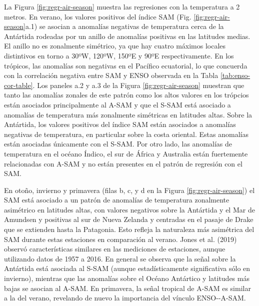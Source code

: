\documentclass[12pt,oneside]{reedthesis}
\begin{document}
La Figura \ref{fig:regr-air-season} muestra las regresiones con la temperatura a 2 metros.
En verano, los valores positivos del índice SAM (Fig. \ref{fig:regr-air-season}a.1) se asocian a anomalías negativas de temperatura cerca de la Antártida rodeadas por un anillo de anomalías positivas en las latitudes medias.
El anillo no es zonalmente simétrico, ya que hay cuatro máximos locales distintivos en torno a 30ºW, 120ºW, 150ºE y 90ºE respectivamente.
En los trópicos, las anomalías son negativas en el Pacífico ecuatorial, lo que concuerda con la correlación negativa entre SAM y ENSO observada en la Tabla \ref{tab:enso-cor-table}.
Los paneles a.2 y a.3 de la Figura \ref{fig:regr-air-season} muestran que tanto las anomalías zonales de este patrón como los altos valores en los trópcios están asociados principalmente al A-SAM y que el S-SAM está asociado a anomalías de temperatura más zonalmente simétricas en latitudes altas.
Sobre la Antártida, los valores positivos del índice SAM están asociados a anomalías negativas de temperatura, en particular sobre la costa oriental.
Estas anomalías están asociadas únicamente con el S-SAM.
Por otro lado, las anomalías de temperatura en el océano Índico, el sur de África y Australia están fuertemente relacionadas con A-SAM y no están presentes en el patrón de regresión con el SAM.

En otoño, invierno y primavera (filas b, c, y d en la Figura \ref{fig:regr-air-season}) el SAM está asociado a un patrón de anomalías de temperatura zonalmente asimétrico en latitudes altas, con valores negativos sobre la Antártida y el Mar de Amundsen y positivas al sur de Nueva Zelanda y centradas en el pasaje de Drake que se extienden hasta la Patagonia.
Esto refleja la naturaleza más asimétrica del SAM durante estas estaciones en comparación al verano.
Jones et al. (2019) observó características similares en las mediciones de estaciones, aunque utilizando datos de 1957 a 2016.
En general se observa que la señal sobre la Antártida está asociada al S-SAM (aunque estadísticamente significativa sólo en invierno), mientras que las anomalías sobre el Océano Antártico y latitudes más bajas se asocian al A-SAM.
En primavera, la señal tropical de A-SAM es similar a la del verano, revelando de nuevo la importancia del vínculo ENSO-\/-A-SAM.
\end{document}

